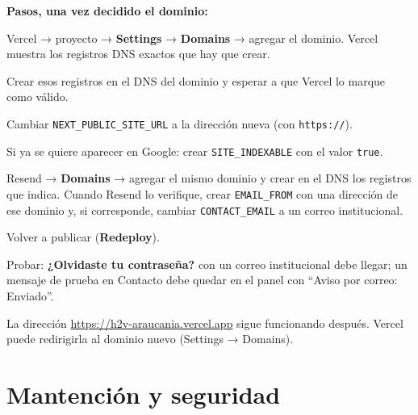 \documentclass[11pt,letterpaper]{article}
\newcommand{\var}[1]{\nolinkurl{#1}}
\begin{document}
\textbf{Pasos, una vez decidido el dominio:}
\begin{pasos}
\item Vercel → proyecto → \textbf{Settings} → \textbf{Domains} → agregar el dominio. Vercel muestra los registros DNS exactos que hay que crear.
\item Crear esos registros en el DNS del dominio y esperar a que Vercel lo marque como válido.
\item Cambiar \var{NEXT_PUBLIC_SITE_URL} a la dirección nueva (con \var{https://}).
\item Si ya se quiere aparecer en Google: crear \var{SITE_INDEXABLE} con el valor \var{true}.
\item Resend → \textbf{Domains} → agregar el mismo dominio y crear en el DNS los registros que indica. Cuando Resend lo verifique, crear \var{EMAIL_FROM} con una dirección de ese dominio y, si corresponde, cambiar \var{CONTACT_EMAIL} a un correo institucional.
\item Volver a publicar (\textbf{Redeploy}).
\item Probar: \textbf{¿Olvidaste tu contraseña?} con un correo institucional debe llegar; un mensaje de prueba en Contacto debe quedar en el panel con ``Aviso por correo: Enviado''.
\end{pasos}

La dirección \url{https://h2v-araucania.vercel.app} sigue funcionando después. Vercel puede redirigirla al dominio nuevo (Settings → Domains).

\section{Mantención y seguridad}
\end{document}
